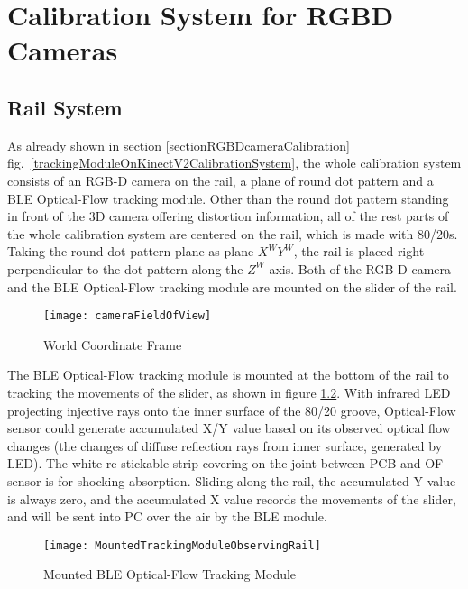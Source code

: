 \chapter{Calibration System for RGBD Cameras} %
\label{sens_CalibrationSystem} %
%
%
\section{Rail System}%
As already shown in section \ref{sectionRGBDcameraCalibration} fig.~\ref{trackingModuleOnKinectV2CalibrationSystem}, the whole calibration system consists of an RGB-D camera on the rail, a plane of round dot pattern and a BLE Optical-Flow tracking module. 
Other than the round dot pattern standing in front of the 3D camera offering distortion information, all of the rest parts of the whole calibration system are centered on the rail, which is made with 80/20s. Taking the round dot pattern plane as plane \(X^WY^W\), the rail is placed right perpendicular to the dot pattern along the \(Z^W\)-axis. Both of the RGB-D camera and the BLE Optical-Flow tracking module are mounted on the slider of the rail.
%
\begin{figure}[h]
\centering
\texttt{[image: cameraFieldOfView]}
\caption{World Coordinate Frame}
\label{cameraFieldOfView}
\end{figure}%
%
\noindent
The BLE Optical-Flow tracking module is mounted at the bottom of the rail to tracking the movements of the slider, as shown in figure \ref{MountedTrackingModuleObservingRail}. With infrared LED projecting injective rays onto the inner surface of the 80/20 groove, Optical-Flow sensor could generate accumulated X/Y value based on its observed optical flow changes (the changes of diffuse reflection rays from inner surface, generated by LED). The white re-stickable strip covering on the joint between PCB and OF sensor is for shocking absorption. Sliding along the rail, the accumulated Y value is always zero, and the accumulated X value records the movements of the slider, and will be sent into PC over the air by the BLE module. 
%
\par
%
\begin{figure}[h]
\centering
\texttt{[image: MountedTrackingModuleObservingRail]}
\caption{Mounted BLE Optical-Flow Tracking Module}
\label{MountedTrackingModuleObservingRail}
\end{figure}%
%
%
%

